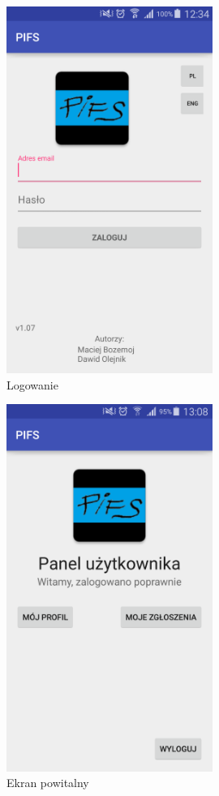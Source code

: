 \documentclass[a4paper,11pt]{article}
\begin{document}
\begin{figure}[H]
	\centering
	\includegraphics[width=0.6\textwidth,height=0.9\textheight]{startPolski.png}
	\caption{Logowanie}
\end{figure}


\begin{figure}[H]
	\centering
	\includegraphics[width=0.6\textwidth,height=0.9\textheight]{logowaniePolski.png}
	\caption{Ekran powitalny}
\end{figure}
\end{document}
